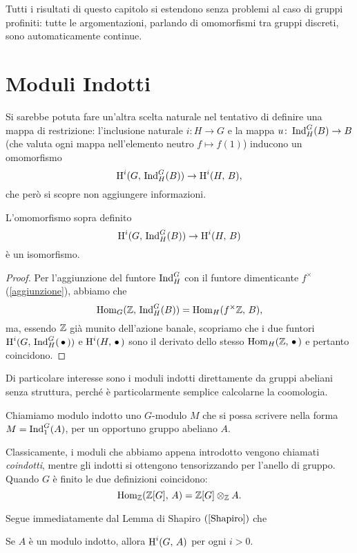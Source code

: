 \begin{profinite}
	Tutti i risultati di questo capitolo si estendono senza problemi al caso di gruppi profiniti: tutte le argomentazioni, parlando di omomorfismi tra gruppi discreti, sono automaticamente continue.
\end{profinite}


\section{Moduli Indotti}
Si sarebbe potuta fare un'altra scelta naturale nel tentativo di definire una mappa di restrizione: l'inclusione naturale $ i \colon H \to G $ e la mappa $ u \colon \operatorname{Ind}_H^G(B) \to B $ (che valuta ogni mappa nell'elemento neutro $ f \mapsto f(1) $) inducono un omomorfismo \[ \operatorname{H}^i(G, \, \operatorname{Ind}_H^G(B)) \to \operatorname{H}^i(H, \, B), \]
che però si scopre non aggiungere informazioni.

\begin{lemma}[di Shapiro] \label{Shapiro}
	L'omomorfismo sopra definito
	\[ \operatorname{H}^i(G, \, \operatorname{Ind}_H^G(B)) \to \operatorname{H}^i(H, \, B) \]
	è un isomorfismo.
\end{lemma}
\begin{proof}
	Per l'aggiunzione del funtore $ \operatorname{Ind}_H^G $ con il funtore dimenticante $ f^\times $ (\ref{aggiunzione}), abbiamo che
	\[ \operatorname{Hom}_G(\mathbb{Z},\, \operatorname{Ind}_H^G(B)) = \operatorname{Hom}_H(f^\times \mathbb{Z}, \, B), \]
	ma, essendo $ \mathbb{Z} $ già munito dell'azione banale, scopriamo che i due funtori $ \operatorname{H}^i(G, \, \operatorname{Ind}_H^G(\,\bullet\,)) $ e $ \operatorname{H}^i(H, \, \bullet\,) $ sono il derivato dello stesso $ \operatorname{Hom}_H(\mathbb{Z}, \,\bullet \,) $ e pertanto coincidono.
\end{proof}

Di particolare interesse sono i moduli indotti direttamente da gruppi abeliani senza struttura, perché è particolarmente semplice calcolarne la coomologia.

\begin{definition}
	Chiamiamo modulo indotto uno $ G $-modulo $ M $ che si possa scrivere nella forma $ M = \operatorname{Ind}_1^G(A) $, per un opportuno gruppo abeliano $ A $.
\end{definition}

Classicamente, i moduli che abbiamo appena introdotto vengono chiamati \emph{coindotti}, mentre gli indotti si ottengono tensorizzando per l'anello di gruppo. Quando $ G $ è finito le due definizioni coincidono:
	\[ \operatorname{Hom}_{\mathbb{Z}}(\mathbb{Z}[G], \, A)  = \mathbb{Z}[G] \otimes_{\mathbb{Z}} A. \]

Segue immediatamente dal Lemma di Shapiro $ (\ref{Shapiro}) $ che
\begin{corollary}\label{indotti}
	Se $ A $ è un modulo indotto, allora $ \operatorname{H}^i(G, \, A) $ per ogni $ i > 0 $.
\end{corollary}

